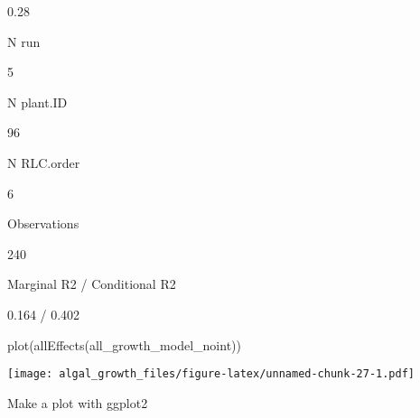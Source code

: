 \documentclass[
]{article}
\newenvironment{Shaded}{\begin{snugshade}}{\end{snugshade}}
\newcommand{\FunctionTok}[1]{\textcolor[rgb]{0.00,0.00,0.00}{#1}}
\newcommand{\NormalTok}[1]{#1}
\begin{document}
0.28

N run

5

N plant.ID

96

N RLC.order

6

Observations

240

Marginal R2 / Conditional R2

0.164 / 0.402

\begin{Shaded}
\begin{Highlighting}[]
\FunctionTok{plot}\NormalTok{(}\FunctionTok{allEffects}\NormalTok{(all\_growth\_model\_noint))}
\end{Highlighting}
\end{Shaded}

\texttt{[image: algal\_growth\_files/figure-latex/unnamed-chunk-27-1.pdf]}

Make a plot with ggplot2
\end{document}
